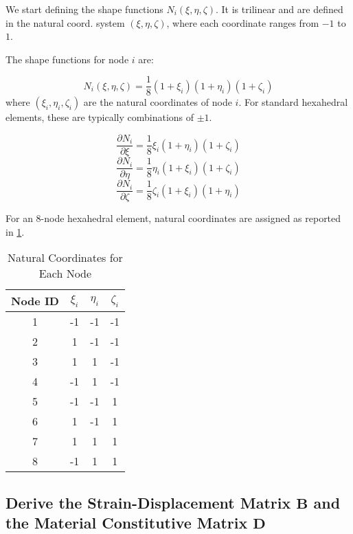 \documentclass{article}
\begin{document}
We start defining the shape functions $ N_i(\xi, \eta, \zeta) $. It is trilinear and are defined in the natural coord. system $ (\xi, \eta, \zeta) $, where each coordinate ranges from $-1$ to $1$.



The shape functions for node $ i $ are:

$$
N_i(\xi, \eta, \zeta) = \frac{1}{8} (1 + \xi_i)(1 + \eta_i)(1 + \zeta_i)
$$
where $ (\xi_i, \eta_i, \zeta_i) $ are the natural coordinates of node $ i $. For standard hexahedral elements, these are typically combinations of $\pm1$.

$$
\frac{\partial N_i}{\partial \xi} = \frac{1}{8} \xi_i (1 + \eta_i )(1 + \zeta_i )
$$
$$
\frac{\partial N_i}{\partial \eta} = \frac{1}{8} \eta_i (1 + \xi_i )(1 + \zeta_i )
$$
$$
\frac{\partial N_i}{\partial \zeta} = \frac{1}{8} \zeta_i (1 + \xi_i )(1 + \eta_i )
$$

For an 8-node hexahedral element, natural coordinates are assigned as reported in \ref{tab:natural_coordinates}.

\begin{table}[h!]
    \centering
    \begin{tabular}{cccc}
        \toprule
        Node ID & $$ \xi_i $$ & $$ \eta_i $$ & $$ \zeta_i $$ \\
        \midrule
        1 & -1 & -1 & -1 \\
        2 & 1 & -1 & -1 \\
        3 & 1 & 1 & -1 \\
        4 & -1 & 1 & -1 \\
        5 & -1 & -1 & 1 \\
        6 & 1 & -1 & 1 \\
        7 & 1 & 1 & 1 \\
        8 & -1 & 1 & 1 \\
        \bottomrule
    \end{tabular}
    \caption{Natural Coordinates for Each Node}
    \label{tab:natural_coordinates}
\end{table}

\subsection{Derive the Strain-Displacement Matrix $ \mathbf{B} $ and the Material Constitutive Matrix $ \mathbf{D} $}
\end{document}
